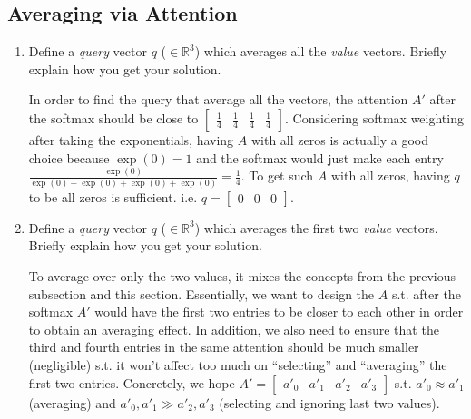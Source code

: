 \documentclass{article}
\newenvironment{solution}{\color{blue}}{}
\begin{document}
\subsection{Averaging via Attention}
  \begin{enumerate}
    \item Define a \textit{query} vector $q$ ($\in \mathbb{R}^{3}$) which averages all the \textit{value} vectors. Briefly explain how you get your solution.
    
    \begin{solution}
      In order to find the query that average all the vectors, the attention $A'$ after the softmax should be close to $\begin{bmatrix}
        \frac{1}{4} & \frac{1}{4} & \frac{1}{4} & \frac{1}{4}
      \end{bmatrix}$. Considering softmax weighting after taking the exponentials, having $A$ with all zeros is actually a good choice because $\exp(0) = 1$ and the softmax would just make each entry $\frac{\exp(0)}{\exp(0) + \exp(0) + \exp(0) + \exp(0)} = \frac{1}{4}$. To get such $A$ with all zeros, having $q$ to be all zeros is sufficient. i.e. $q = \begin{bmatrix}
        0 & 0 & 0
      \end{bmatrix}$.
    \end{solution}


    \item Define a \textit{query} vector $q$ ($\in \mathbb{R}^{3}$) which averages the first two \textit{value} vectors. Briefly explain how you get your solution.
    
    \begin{solution}
      To average over only the two values, it mixes the concepts from the previous subsection and this section. Essentially, we want to design the $A$ s.t. after the softmax $A'$ would have the first two entries to be closer to each other in order to obtain an averaging effect. In addition, we also need to ensure that the third and fourth entries in the same attention should be much smaller (negligible) s.t. it won't affect too much on ``selecting'' and ``averaging'' the first two entries. Concretely, we hope $A' = \begin{bmatrix}
        a'_0 & a'_1 & a'_2 & a'_3
      \end{bmatrix}$ s.t. $a'_0 \approx a'_1$ (averaging) and $a'_0, a'_1 \gg a'_2, a'_3$ (selecting and ignoring last two values). 


\end{solution}
\end{enumerate}
\end{document}
